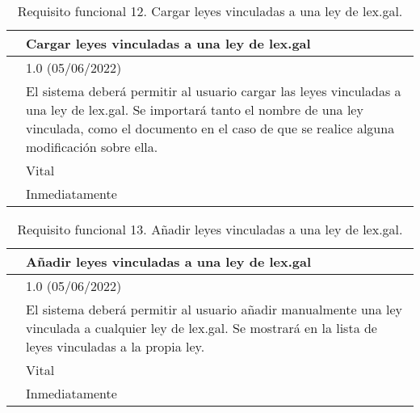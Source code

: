\begin{table}[H]
\begin{center}
\begin{tabular}{|p{3cm}|p{10cm}|} \hline
\centering {\bf FRQ-12} & Cargar leyes vinculadas a una ley de lex.gal  \\ \hline\hline
\centering {\bf Versión} & 1.0 (05/06/2022) \\ \hline
\centering {\bf Descripción} & El sistema deberá permitir al usuario cargar las leyes vinculadas a una ley de lex.gal. Se importará tanto el nombre de una ley vinculada, como el documento en el caso de que se realice alguna modificación sobre ella. \\ \hline
\centering {\bf Importancia} & Vital \\ \hline
\centering {\bf Urgencia} & Inmediatamente \\ \hline
\end{tabular}
\caption{Requisito funcional 12. Cargar leyes vinculadas a una ley de lex.gal.}
\label{enlaceFRQ12}
\end{center}
\end{table}

\begin{table}[H]
\begin{center}
\begin{tabular}{|p{3cm}|p{10cm}|} \hline
\centering {\bf FRQ-13} & Añadir leyes vinculadas a una ley de lex.gal  \\ \hline\hline
\centering {\bf Versión} & 1.0 (05/06/2022) \\ \hline
\centering {\bf Descripción} & El sistema deberá permitir al usuario añadir manualmente una ley vinculada a cualquier ley de lex.gal. Se mostrará en la lista de leyes vinculadas a la propia ley. \\ \hline
\centering {\bf Importancia} & Vital \\ \hline
\centering {\bf Urgencia} & Inmediatamente \\ \hline
\end{tabular}
\caption{Requisito funcional 13. Añadir leyes vinculadas a una ley de lex.gal.}
\label{enlaceFRQ13}
\end{center}
\end{table}

